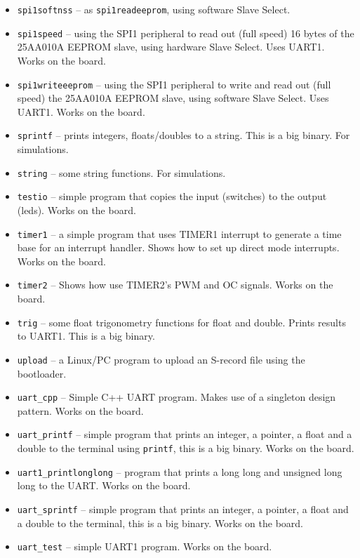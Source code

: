 \documentclass[12pt]{article}
\begin{document}
\begin{itemize}
\item \lstinline|spi1softnss| -- as \lstinline|spi1readeeprom|, using software Slave Select.
\item \lstinline|spi1speed| -- using the SPI1 peripheral to read out (full speed) 16 bytes of the 25AA010A EEPROM slave, using hardware Slave Select. Uses UART1. Works on the board.
\item \lstinline|spi1writeeeprom| -- using the SPI1 peripheral to write and read out (full speed) the 25AA010A EEPROM slave, using software Slave Select. Uses UART1. Works on the board.
\item \lstinline|sprintf| -- prints integers, floats/doubles to a string. This is a big binary. For simulations.
\item \lstinline|string| -- some string functions. For simulations.
\item \lstinline|testio| -- simple program that copies the input (switches) to the output (leds). Works on the board.
\item \lstinline|timer1| -- a simple program that uses TIMER1 interrupt to generate a time base for an interrupt handler. Shows how to set up direct mode interrupts. Works on the board.
\item \lstinline|timer2| -- Shows how use TIMER2's PWM and OC signals. Works on the board.
\item \lstinline|trig| -- some float trigonometry functions for float and double. Prints results to UART1. This is a big binary.
\item \lstinline|upload| -- a Linux/PC program to upload an S-record file using the bootloader.
\item \lstinline|uart_cpp| -- Simple C++ UART program. Makes use of a singleton design pattern. Works on the board.
\item \lstinline|uart_printf| -- simple program that prints an integer, a pointer, a float and a double to the terminal using \lstinline|printf|, this is a big binary. Works on the board.
\item \lstinline|uart1_printlonglong| -- program that prints a long long and unsigned long long to the UART. Works on the board.
\item \lstinline|uart_sprintf| -- simple program that prints an integer, a pointer, a float and a double to the terminal, this is a big binary. Works on the board.
\item \lstinline|uart_test| -- simple UART1 program. Works on the board.
\end{itemize} 
\end{document}
